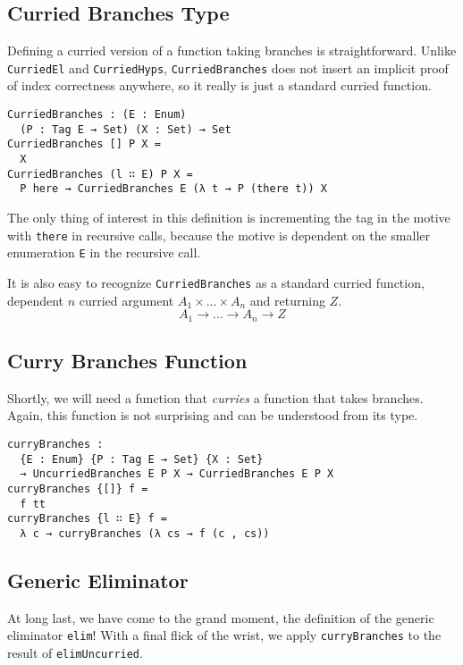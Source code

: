 \documentclass[preprint,nonatbib]{sigplanconf}
\begin{document}
\subsection{Curried Branches Type}

Defining a curried version of a function taking branches is
straightforward. Unlike {\tt CurriedEl} and {\tt CurriedHyps},
{\tt CurriedBranches} does not insert an implicit proof of index
correctness anywhere, so it really is just a standard curried
function.

\begin{verbatim}
CurriedBranches : (E : Enum)
  (P : Tag E → Set) (X : Set) → Set
CurriedBranches [] P X =
  X
CurriedBranches (l ∷ E) P X =
  P here → CurriedBranches E (λ t → P (there t)) X
\end{verbatim}

The only thing of interest in this definition is incrementing the tag
in the motive with {\tt there} in recursive calls, because the motive
is dependent on the smaller enumeration {\tt E} in the recursive call.

It is also easy to recognize {\tt CurriedBranches} as a standard
curried function, dependent $n$ curried argument $A_1 × ... × A_n$ and
returning $Z$.
\[
A_1 → ... → A_n → Z
\]

\subsection{Curry Branches Function}

Shortly, we will need a function that {\it curries} a function that
takes branches. Again, this function is not surprising and can be
understood from its type.

\begin{verbatim}
curryBranches :
  {E : Enum} {P : Tag E → Set} {X : Set}
  → UncurriedBranches E P X → CurriedBranches E P X
curryBranches {[]} f =
  f tt
curryBranches {l ∷ E} f =
  λ c → curryBranches (λ cs → f (c , cs))
\end{verbatim}

\subsection{Generic Eliminator}

At long last, we have come to the grand moment, the definition of the
generic eliminator {\tt elim}! With a final flick of the wrist, we
apply {\tt curryBranches} to the result of {\tt elimUncurried}.
\end{document}
